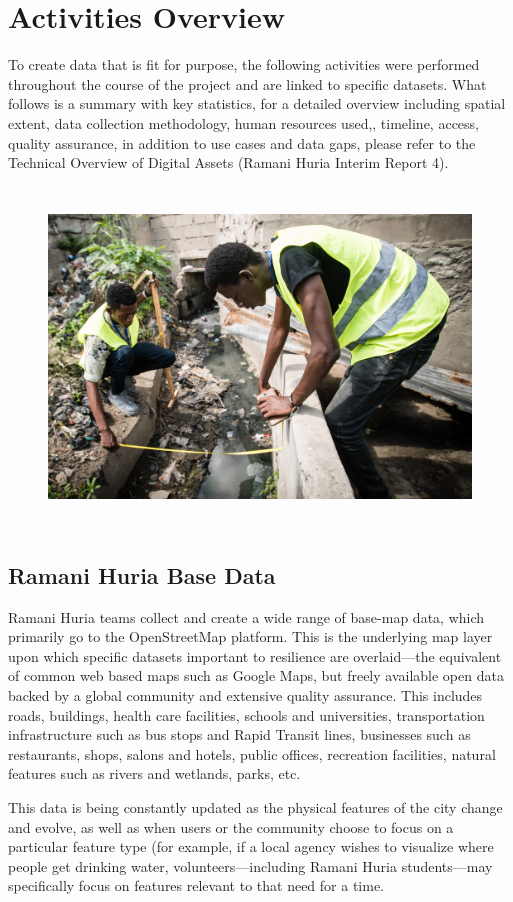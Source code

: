 \documentclass[a4paper,12pt,twoside]{article}
\begin{document}
\newpage
\section{Activities Overview}
\begin{multicols}{2}
To create data that is fit for purpose, the following activities were performed throughout the course of the project and are linked to specific datasets. What follows is a summary with key statistics, for a detailed overview including spatial extent, data collection methodology, human resources used,, timeline, access, quality assurance, in addition to use cases and data gaps, please refer to the Technical Overview of Digital Assets (Ramani Huria Interim Report 4). 
\end{multicols}

\begin{figure}[h!]
	\centering
	\includegraphics[width=\textwidth, height=9cm,keepaspectratio]{images/Drainage_fieldwork.JPG}
\end{figure}

\subsection{Ramani Huria Base Data}
\begin{multicols}{2}
Ramani Huria teams collect and create a wide range of base-map data, which primarily go to the OpenStreetMap platform. This is the underlying map layer upon which specific datasets important to resilience are overlaid—the equivalent of common web based maps such as Google Maps, but freely available open data backed by a global community and extensive quality assurance. This includes roads, buildings, health care facilities, schools and universities, transportation infrastructure such as bus stops and Rapid Transit lines, businesses such as restaurants, shops, salons and hotels, public offices, recreation facilities, natural features such as rivers and wetlands, parks, etc. 

This data is being constantly updated as the physical features of the city change and evolve, as well as when users or the community choose to focus on a particular feature type (for example, if a local agency wishes to visualize where people get drinking water, volunteers—including Ramani Huria students—may specifically focus on features relevant to that need for a time.
\end{multicols}
\end{document}
